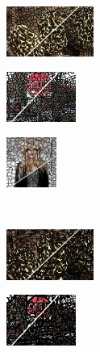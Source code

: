 \begin{figure}
	\begin{subfigure}[b]{0.02\textwidth}
	\end{subfigure}
	\begin{subfigure}[b]{0.16\textwidth}
		\includegraphics[height=1.65cm]{pictures/bsds500/wp/cropped/wp_208078_contours}
	\end{subfigure}
	\begin{subfigure}[b]{0.129\textwidth}
		\includegraphics[height=1.65cm]{pictures/sbd/wp/cropped/wp_6000067_contours}
	\end{subfigure}
	\begin{subfigure}[b]{0.10\textwidth}
		\includegraphics[height=1.65cm]{pictures/fash/wp/cropped/wp_132_contours}
	\end{subfigure}\\
	\begin{subfigure}[b]{0.02\textwidth}
	\end{subfigure}
	\begin{subfigure}[b]{0.16\textwidth}
		\includegraphics[height=1.65cm]{pictures/bsds500/etps/cropped/etps_208078_contours}
	\end{subfigure}
	\begin{subfigure}[b]{0.129\textwidth}
		\includegraphics[height=1.65cm]{pictures/sbd/etps/cropped/etps_6000067_contours}

\end{subfigure}
\end{figure}
